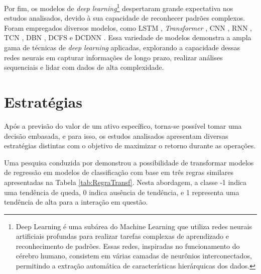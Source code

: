 Por fim, os modelos de \textit{deep learning}\footnote{Deep Learning é uma subárea do Machine Learning que utiliza redes neurais artificiais profundas para realizar tarefas complexas de aprendizado e reconhecimento de padrões. Essas redes, inspiradas no funcionamento do cérebro humano, consistem em várias camadas de neurônios interconectados, permitindo a extração automática de características hierárquicas dos dados.} despertaram grande expectativa nos estudos analisados, devido à sua capacidade de reconhecer padrões complexos. Foram empregados diversos modelos, como \ac{LSTM} \cite{anwar2019forecasting, Xiaoci_Predicting, Jian_Forecasting, gao2021stock,  lee2021exploring, Firat}, \textit{Transformer} \cite{Chaojie_Stock}, \ac{CNN} \cite{Anand_Comparison}, \ac{RNN} \cite{Xiaoci_Predicting, gao2021stock, Anand_Comparison, Firat}, \ac{TCN} \cite{Firat}, \ac{DBN} \cite{Xiaoci_Predicting}, \ac{DCFS} \cite{Li-Xin_Fast} e \ac{DCDNN} \cite{Jian_Forecasting}. Essa variedade de modelos demonstra a ampla gama de técnicas de \textit{deep learning} aplicadas, explorando a capacidade dessas redes neurais em capturar informações de longo prazo, realizar análises sequenciais e lidar com dados de alta complexidade. 

\section{Estratégias}
\label{subsec:estrategias}

Após a previsão do valor de um ativo específico, torna-se possível tomar uma decisão embasada, e para isso, os estudos analisados apresentam diversas estratégias distintas com o objetivo de maximizar o retorno durante as operações. 

Uma pesquisa conduzida por  demonstrou a possibilidade de transformar modelos de regressão em modelos de classificação com base em três regras similares apresentadas na Tabela \ref{tab:RegraTransf}. Nesta abordagem, a classe -1 indica uma tendência de queda, 0 indica ausência de tendência, e 1 representa uma tendência de alta para a interação em questão. 


